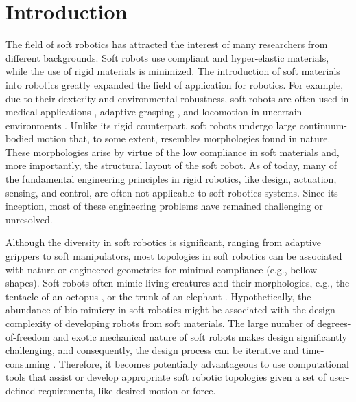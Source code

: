 
\section{Introduction}
The field of soft robotics has attracted the interest of many researchers from different backgrounds. Soft robots use compliant and hyper-elastic materials, while the use of rigid materials is minimized. The introduction of soft materials into robotics greatly expanded the field of application for robotics. For example, due to their dexterity and environmental robustness, soft robots are often used in medical applications \cite{Polygerinos2015, Yap2015, Asbeck2015Nov}, adaptive grasping \cite{Galloway2016, Hughes2016}, and locomotion in uncertain environments \cite{Drotman2017}. Unlike its rigid counterpart, soft robots undergo large continuum-bodied motion that, to some extent, resembles morphologies found in nature. These morphologies arise by virtue of the low compliance in soft materials and, more importantly, the structural layout of the soft robot. As of today, many of the fundamental engineering principles in rigid robotics, like design, actuation, sensing, and control, are often not applicable to soft robotics systems. Since its inception, most of these engineering problems have remained challenging or unresolved.

Although the diversity in soft robotics is significant, ranging from adaptive grippers to soft manipulators, most topologies in soft robotics can be associated with nature or engineered geometries for minimal compliance (e.g., bellow shapes). Soft robots often mimic living creatures and their morphologies, e.g., the tentacle of an octopus \cite{Galloway2016, Wehner2016}, or the trunk of an elephant \cite{Drotman2017}. Hypothetically, the abundance of bio-mimicry in soft robotics might be associated with the design complexity of developing robots from soft materials. The large number of degrees-of-freedom and exotic mechanical nature of soft robots makes design significantly challenging, and consequently, the design process can be iterative and time-consuming \cite{Wehner2016}. Therefore, it becomes potentially advantageous to use computational tools that assist or develop appropriate soft robotic topologies given a set of user-defined requirements, like desired motion or force.

